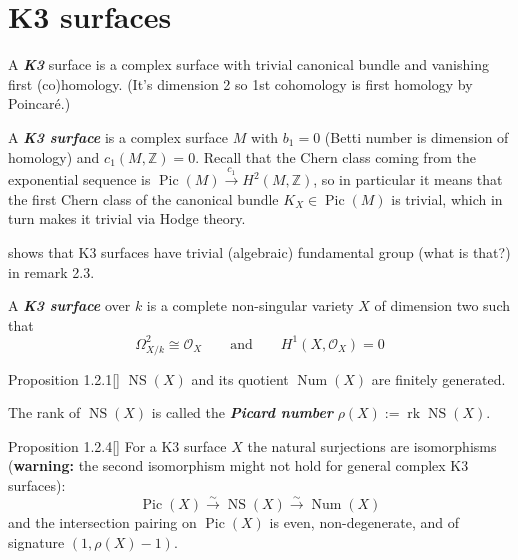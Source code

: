 \section{K3 surfaces}
\begin{defn}[dani]\leavevmode
A \textit{\textbf{K3}} surface is a complex surface with trivial canonical bundle and vanishing first (co)homology. (It's dimension 2 so 1st cohomology is first homology by Poincaré.)
\end{defn}

\begin{defn}[K3 course]\leavevmode
A \textit{\textbf{K3 surface}} is a complex surface \(M\) with \(b_1=0\) (Betti number is dimension of homology) and \(c_1(M,\mathbb{Z})=0\). Recall that the Chern class coming from the exponential sequence is \(\operatorname{Pic}(M) \xrightarrow{c_1}H^{2}(M,\mathbb{Z})\), so in particular it means that the first Chern class of the canonical bundle \(K_X \in \operatorname{Pic}(M)\) is trivial, which in turn makes it trivial via Hodge theory.
\end{defn}

\begin{remark}\leavevmode
\cite{huk} shows that K3 surfaces have trivial (algebraic) fundamental group (what is that?) in remark 2.3.
\end{remark}

\begin{defn}\leavevmode
A \textit{\textbf{K3 surface}} over \(k\) is a complete non-singular variety \(X\) of dimension two such that
 \[\Omega^2_{X/k}\cong \mathcal{O}_X\qquad \text{and} \qquad H^{1}(X,\mathcal{O}_X)=0\]
\end{defn}

\begin{thing4}{Proposition 1.2.1}[\cite{huk}]\leavevmode
\(\operatorname{NS}(X)\) and its quotient  \(\operatorname{Num}(X)\) are finitely generated.

The rank of \(\operatorname{NS}(X)\) is called the \textit{\textbf{Picard number}} \(\rho(X):=\operatorname{rk}\operatorname{NS}(X)\).
\end{thing4}

\begin{thing4}{Proposition 1.2.4}[\cite{huk}]\label{prop:1.2.4}\leavevmode
For a K3 surface \(X\) the natural surjections are isomorphisms (\textbf{warning:} the second isomorphism might not hold for general complex K3 surfaces):
\[\operatorname{Pic}(X) \xrightarrow{\sim}\operatorname{NS}(X)\xrightarrow{\sim}\operatorname{Num}(X)\]
and the intersection pairing on \(\operatorname{Pic}(X)\) is even, non-degenerate, and of signature \((1,\rho(X)-1)\).
\end{thing4}

